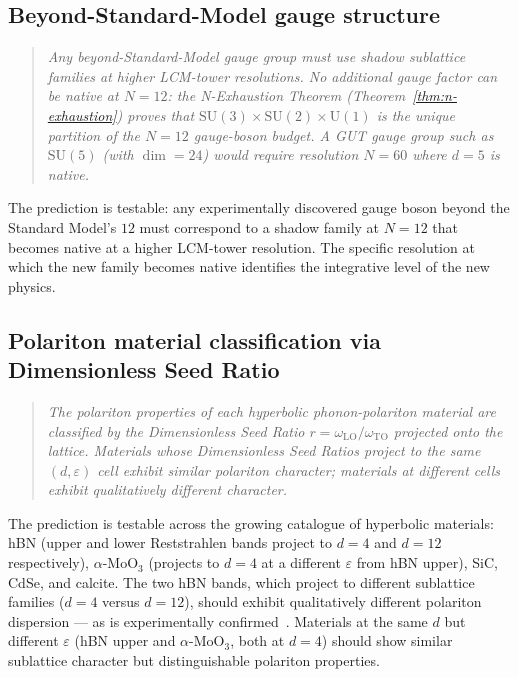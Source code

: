 \documentclass[11pt,a4paper]{article}
\theoremstyle{definition}
\theoremstyle{remark}
\begin{document}
\subsection{Beyond-Standard-Model gauge structure}\label{subsec:bsm-prediction}

\begin{quote}\itshape
Any beyond-Standard-Model gauge group must use shadow sublattice families at higher LCM-tower resolutions. No additional gauge factor can be native at $N = 12$: the N-Exhaustion Theorem (Theorem~\ref{thm:n-exhaustion}) proves that $\mathrm{SU}(3)\times\mathrm{SU}(2)\times\mathrm{U}(1)$ is the unique partition of the $N = 12$ gauge-boson budget. A GUT gauge group such as $\mathrm{SU}(5)$ (with $\dim = 24$) would require resolution $N = 60$ where $d = 5$ is native.
\end{quote}

The prediction is testable: any experimentally discovered gauge boson beyond the Standard Model's $12$ must correspond to a shadow family at $N = 12$ that becomes native at a higher LCM-tower resolution. The specific resolution at which the new family becomes native identifies the integrative level of the new physics.

\subsection{Polariton material classification via Dimensionless Seed Ratio}\label{subsec:polariton-prediction}

\begin{quote}\itshape
The polariton properties of each hyperbolic phonon-polariton material are classified by the Dimensionless Seed Ratio $r = \omega_{\mathrm{LO}}/\omega_{\mathrm{TO}}$ projected onto the lattice. Materials whose Dimensionless Seed Ratios project to the same $(d, \varepsilon)$ cell exhibit similar polariton character; materials at different cells exhibit qualitatively different character.
\end{quote}

The prediction is testable across the growing catalogue of hyperbolic materials: hBN (upper and lower Reststrahlen bands project to $d=4$ and $d=12$ respectively), $\alpha$-MoO$_{3}$ (projects to $d=4$ at a different $\varepsilon$ from hBN upper), SiC, CdSe, and calcite. The two hBN bands, which project to different sublattice families ($d=4$ versus $d=12$), should exhibit qualitatively different polariton dispersion --- as is experimentally confirmed~\cite{Bucher2025}. Materials at the same $d$ but different $\varepsilon$ (hBN upper and $\alpha$-MoO$_{3}$, both at $d=4$) should show similar sublattice character but distinguishable polariton properties.
\end{document}
